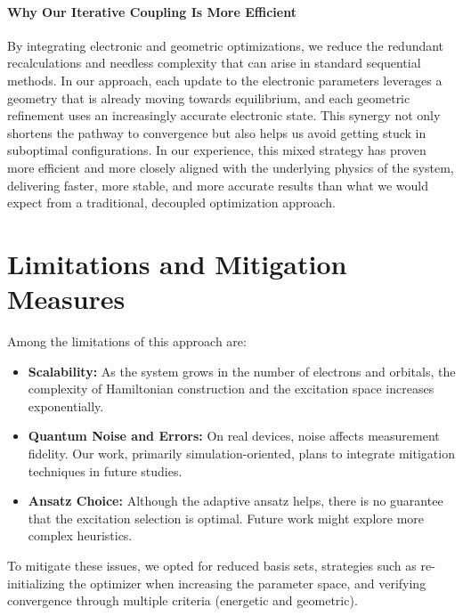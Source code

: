 \paragraph{Why Our Iterative Coupling Is More Efficient}
By integrating electronic and geometric optimizations, we reduce the redundant recalculations and needless complexity that can arise in standard sequential methods. In our approach, each update to the electronic parameters leverages a geometry that is already moving towards equilibrium, and each geometric refinement uses an increasingly accurate electronic state. This synergy not only shortens the pathway to convergence but also helps us avoid getting stuck in suboptimal configurations. In our experience, this mixed strategy has proven more efficient and more closely aligned with the underlying physics of the system, delivering faster, more stable, and more accurate results than what we would expect from a traditional, decoupled optimization approach.

\section{Limitations and Mitigation Measures}

Among the limitations of this approach are:
\begin{itemize}
    \item \textbf{Scalability:} As the system grows in the number of electrons and orbitals, the complexity of Hamiltonian construction and the excitation space increases exponentially.
    \item \textbf{Quantum Noise and Errors:} On real devices, noise affects measurement fidelity. Our work, primarily simulation-oriented, plans to integrate mitigation techniques in future studies.
    \item \textbf{Ansatz Choice:} Although the adaptive ansatz helps, there is no guarantee that the excitation selection is optimal. Future work might explore more complex heuristics.
\end{itemize}

To mitigate these issues, we opted for reduced basis sets, strategies such as re-initializing the optimizer when increasing the parameter space, and verifying convergence through multiple criteria (energetic and geometric).

